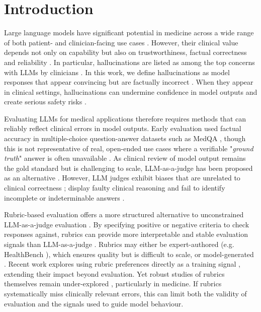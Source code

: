 \documentclass{article}
\begin{document}
\section{Introduction}

Large language models have significant potential in medicine across a wide range of both patient- and clinician-facing use cases \citep{singhal_large_2023, kweon_ehrnoteqa_2024, tu_towards_amie_2025, Draelos2026, singhal_toward_2025}. However, their clinical value depends not only on capability but also on trustworthiness, factual correctness and reliability \citep{thirunavukarasu_large_2023, aljohani-etal-2025-comprehensive, zheng2025large}. In particular, hallucinations are listed as among the top concerns with LLMs by clinicians \citep{Spotnitz2024LLM, Ozkan2025LLM, Yarar2026LLM}. In this work, we define hallucinations as model responses that appear convincing but are factually incorrect \citep{kim-etal-2025-detecting}. When they appear in clinical settings, hallucinations can undermine confidence in model outputs and create serious safety risks \citep{hager_evaluation_2024, kim_medical_2025}.

Evaluating LLMs for medical applications therefore requires methods that can reliably reflect clinical errors in model outputs. Early evaluation used factual accuracy in multiple-choice question-answer datasets such as MedQA \citep{jin2020_medqa, singhal_large_2023}, though this is not representative of real, open-ended use cases where a verifiable "\textit{ground truth}" answer is often unavailable \citep{bedi_medhelm_2025, chen_beyond_medcheck_2025}. As clinical review of model output remains the gold standard but is challenging to scale, LLM-as-a-judge has been proposed as an alternative \citep{zheng_chatbotarena_2023, aali_medval_2025}. However, LLM judges exhibit biases that are unrelated to clinical correctness \citep{eiras_know_2025}; display faulty clinical reasoning \citep{hager_evaluation_2024, mccoy_reasoning_2025} and fail to identify incomplete or indeterminable answers \citep{delucia_same_2026, Watanabe2026ClinDetBenchBA}.

Rubric-based evaluation offers a more structured alternative to unconstrained LLM-as-a-judge evaluation \citep{liu-etal-2023-g, liu2026openrubricsscalablesyntheticrubric}. By specifying positive or negative criteria to check responses against, rubrics can provide more interpretable and stable evaluation signals than LLM-as-a-judge \citep{li-etal-2026-rubrichub, dhole_rubricrag_2026}. Rubrics may either be expert-authored (e.g. HealthBench \citep{arorahealthbench2025}), which ensures quality but is difficult to scale, or model-generated \citep{liu2026openrubricsscalablesyntheticrubric, dhole_rubricrag_2026, li-etal-2026-rubrichub, chen_automated_2026}. Recent work explores using rubric preferences directly as a training signal \citep{gunjal_rubrics_2025, li2026evolmselfevolvinglanguagemodels}, extending their impact beyond evaluation. Yet robust studies of rubrics themselves remain under-explored \citep{qi2026riftrubricfailuremode, pan2026rubricevalrubriclevelmetaevaluationbenchmark}, particularly in medicine. If rubrics systematically miss clinically relevant errors, this can limit both the validity of evaluation and the signals used to guide model behaviour.
\end{document}
